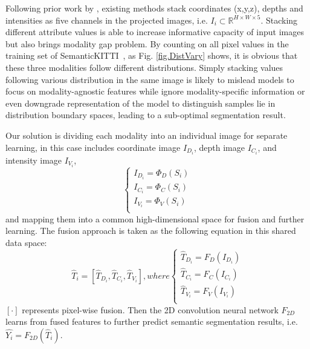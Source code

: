 \documentclass[preprint,review,3p]{elsarticle}
\begin{document}
Following prior work by \cite{wu2018squeezeseg}, existing methods \cite{wu2018squeezeseg,wu2019squeezesegv2,xu2020squeezesegv3, milioto2019rangenet++, alonso20203d, cortinhal2020salsanext} stack coordinates (x,y,z), depths and intensities as five channels in the projected images, i.e. $I_{i}\subset \mathbb{R}^{H \times W \times 5}$. Stacking different attribute values is able to increase informative capacity of input images but also brings modality gap problem. By counting on all pixel values in the training set of SemanticKITTI~\cite{behley2019semantickitti}, as Fig. \ref{fig.DistVary} shows, it is obvious that these three modalities follow different distributions. 
Simply stacking values following various distribution in the same image is likely to mislead models to focus on modality-agnostic features while ignore modality-specific information or even downgrade representation of the model to distinguish samples lie in distribution boundary spaces, leading to a sub-optimal segmentation result. 

Our solution is dividing each modality into an individual image for separate learning, in this case includes coordinate image $I_{D_i}$,  depth image $I_{C_i}$, and intensity image $I_{V_i}$,
\begin{equation}
\left\{ 
  \begin{array}{lr}
  I_{D_i}=\Phi_{D}(S_i) \\
  I_{C_i}=\Phi_{C}(S_i) \\
  I_{V_i}=\Phi_{V}(S_i) \\
  \end{array}
\right.
\end{equation}
and mapping them into a common high-dimensional space for fusion and further learning. The fusion approach is taken as the following equation in this shared data space: 
\begin{equation}
\hat{T}_{i}=[\hat{T}_{D_i}, \hat{T}_{C_i}, \hat{T}_{V_i}], where
\left\{ 
  \begin{array}{lr}
  \hat{T}_{D_i}=F_{D}(I_{D_i}) \\
  \hat{T}_{C_i}=F_{C}(I_{C_i}) \\
  \hat{T}_{V_i}=F_{V}(I_{V_i}) \\
  \end{array}
\right.
\end{equation}
$[\cdot]$ represents pixel-wise fusion. Then the 2D convolution neural network $F_{2D}$ learns from fused features to further predict semantic segmentation results, i.e. $\hat{Y_i}=F_{2D}(\hat{T}_{i})$. 
\end{document}
